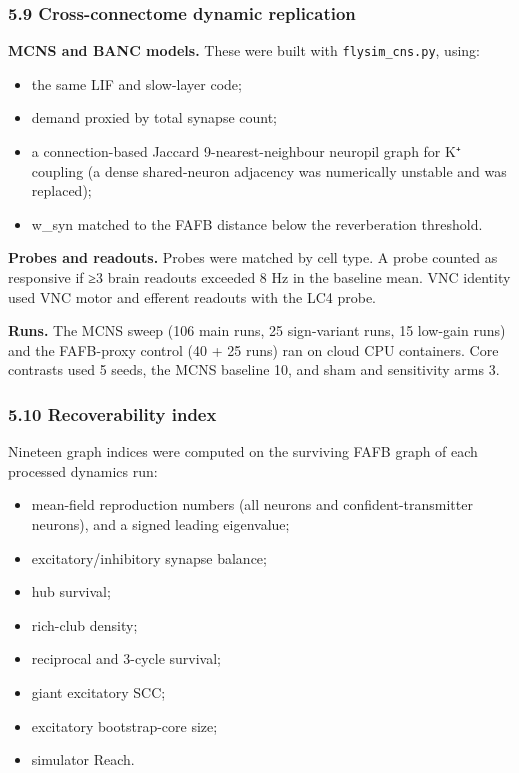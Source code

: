 \documentclass[11pt]{article}
\providecommand{\tightlist}{\setlength{\itemsep}{0pt}\setlength{\parskip}{0pt}}
\begin{document}
\subsubsection{5.9 Cross-connectome dynamic replication}\label{cross-connectome-dynamic-replication}

\textbf{MCNS and BANC models.} These were built with \texttt{flysim\_cns.py}, using:

\begin{itemize}
\tightlist
\item
  the same LIF and slow-layer code;
\item
  demand proxied by total synapse count;
\item
  a connection-based Jaccard 9-nearest-neighbour neuropil graph for K⁺ coupling (a dense shared-neuron adjacency was numerically unstable and was replaced);
\item
  w\_syn matched to the FAFB distance below the reverberation threshold.
\end{itemize}

\textbf{Probes and readouts.} Probes were matched by cell type. A probe counted as responsive if ≥3 brain readouts exceeded 8 Hz in the baseline mean. VNC identity used VNC motor and efferent readouts with the LC4 probe.

\textbf{Runs.} The MCNS sweep (106 main runs, 25 sign-variant runs, 15 low-gain runs) and the FAFB-proxy control (40 + 25 runs) ran on cloud CPU containers. Core contrasts used 5 seeds, the MCNS baseline 10, and sham and sensitivity arms 3.

\subsubsection{5.10 Recoverability index}\label{recoverability-index}

Nineteen graph indices were computed on the surviving FAFB graph of each processed dynamics run:

\begin{itemize}
\tightlist
\item
  mean-field reproduction numbers (all neurons and confident-transmitter neurons), and a signed leading eigenvalue;
\item
  excitatory/inhibitory synapse balance;
\item
  hub survival;
\item
  rich-club density;
\item
  reciprocal and 3-cycle survival;
\item
  giant excitatory SCC;
\item
  excitatory bootstrap-core size;
\item
  simulator Reach.
\end{itemize}
\end{document}
